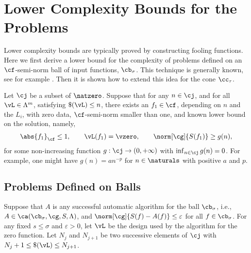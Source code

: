 \documentclass[]{elsarticle}
\theoremstyle{definition}
\theoremstyle{remark}
\newcommand{\Fnorm}[1]{\abs{#1}_{\cf}}
\newcommand{\Gnorm}[1]{\norm[\cg]{#1}}
\begin{document}
\section{Lower Complexity Bounds for the Problems} \label{LowBoundSec}
Lower complexity bounds are typically proved by constructing fooling functions.  Here we first derive a lower bound for the complexity of problems defined on an $\cf$-semi-norm ball of input functions, $\cb_\sigma$.  This technique is generally known, see for example \cite[p.\ 11--12]{TraWer98}.  Then it is shown how to extend this idea for the cone $\cc_{\tau}$. 

Let $\cj$ be a subset of $\natzero$.  Suppose that for any $n \in \cj$, and for all $\vL \in \Lambda^m$, satisfying $\$(\vL)\le n$, there exists an $f_1 \in \cf$, depending on $n$ and the $L_i$, with zero data, $\cf$-semi-norm smaller than one, and known lower bound on the solution, namely,
\begin{equation} \label{assumpfone}
\Fnorm{f_1} \le 1, \qquad \vL(f_1)= \vzero, \qquad
\norm[\cg]{S(f_1)} \ge g(n), 
\end{equation}
for some non-increasing function $g:\cj \to (0,+\infty)$ with $\inf_{n \in \cj} g(n)=0$.  For example, one might have $g(n)=a n^{-p}$ for $n \in \naturals$ with positive $a$ and $p$.

\subsection{Problems Defined on Balls} 
Suppose that $A$ is any successful automatic algorithm for the ball $\cb_{\sigma}$, i.e., $A \in \ca(\cb_{\sigma},\cg,S,\Lambda)$, and $\Gnorm{S(f)-A(f)}\le \varepsilon$ for all $f \in \cb_{\sigma}$.  For any fixed $s \le \sigma$ and $\varepsilon>0$, let $\vL$ be the design used by the algorithm for the zero function.  Let $N_{j}$ and $N_{j+1}$ be two successive elements of $\cj$ with $N_{j}+1 \le \$(\vL) \le N_{j+1}$.
\end{document}
